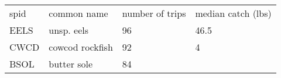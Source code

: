 \documentclass[]{article}
\begin{document}
\begin{longtable}[c]{@{}llll@{}}
\toprule\addlinespace
\begin{minipage}[b]{0.08\columnwidth}\raggedright
spid
\end{minipage} & \begin{minipage}[b]{0.36\columnwidth}\raggedright
common name
\end{minipage} & \begin{minipage}[b]{0.21\columnwidth}\raggedright
number of trips
\end{minipage} & \begin{minipage}[b]{0.23\columnwidth}\raggedright
median catch (lbs)
\end{minipage}
\\\addlinespace
\midrule\endhead
\begin{minipage}[t]{0.08\columnwidth}\raggedright
EELS
\end{minipage} & \begin{minipage}[t]{0.36\columnwidth}\raggedright
unsp. eels
\end{minipage} & \begin{minipage}[t]{0.21\columnwidth}\raggedright
96
\end{minipage} & \begin{minipage}[t]{0.23\columnwidth}\raggedright
46.5
\end{minipage}
\\\addlinespace
\begin{minipage}[t]{0.08\columnwidth}\raggedright
CWCD
\end{minipage} & \begin{minipage}[t]{0.36\columnwidth}\raggedright
cowcod rockfish
\end{minipage} & \begin{minipage}[t]{0.21\columnwidth}\raggedright
92
\end{minipage} & \begin{minipage}[t]{0.23\columnwidth}\raggedright
4
\end{minipage}
\\\addlinespace
\begin{minipage}[t]{0.08\columnwidth}\raggedright
BSOL
\end{minipage} & \begin{minipage}[t]{0.36\columnwidth}\raggedright
butter sole
\end{minipage} & \begin{minipage}[t]{0.21\columnwidth}\raggedright
84
\end{minipage} & \begin{minipage}[t]{0.23\columnwidth}\raggedright

\end{minipage}
\end{longtable}
\end{document}
